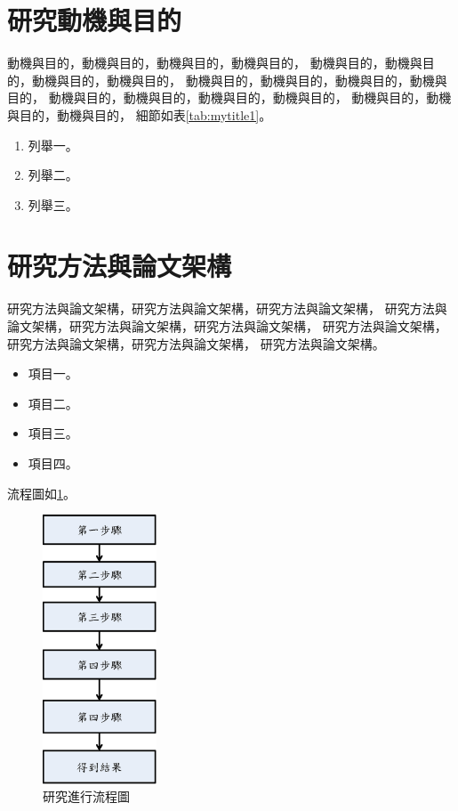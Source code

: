 \section{研究動機與目的}
    動機與目的，動機與目的，動機與目的，動機與目的，
    動機與目的，動機與目的，動機與目的，動機與目的，
    動機與目的，動機與目的，動機與目的，動機與目的，
    動機與目的，動機與目的，動機與目的，動機與目的，
    動機與目的，動機與目的，動機與目的，
    細節如表\ref{tab:mytitle1}。

    \begin{enumerate}
        \item
        列舉一。
        \item
        列舉二。
        \item
        列舉三。
    \end{enumerate}

\section {研究方法與論文架構}
    研究方法與論文架構，研究方法與論文架構，研究方法與論文架構，
    研究方法與論文架構，研究方法與論文架構，研究方法與論文架構，
    研究方法與論文架構，研究方法與論文架構，研究方法與論文架構，
    研究方法與論文架構。

    \begin{itemize}
        \item
        項目一。
        \item
        項目二。
        \item
        項目三。
        \item
        項目四。
    \end{itemize}

    流程圖如\ref{fig:ResearchFlowChart}。
    \begin{figure}[htbp]
        \centering
        \includegraphics[height=8cm]{graphs/introduction/ResearchFlowChart.eps}
        \caption{研究進行流程圖}
        \label{fig:ResearchFlowChart}
    \end{figure}

